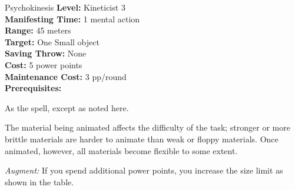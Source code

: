 {Psychokinesis}
{
	\textbf{Level:}
	Kineticist 3\\
	\textbf{Manifesting Time:}
	1 mental action\\
	\textbf{Range:}
	45 meters\\
	\textbf{Target:}
	One Small object\\
	\textbf{Saving Throw:}
	None\\
	\textbf{Cost:}
	5 power points\\
	\textbf{Maintenance Cost:}
	3 pp/round\\
	\textbf{Prerequisites:}
	\\
}
{
	As the  spell, except as noted here.

	The material being animated affects the difficulty of the task; stronger or more brittle materials are harder to animate than weak or floppy materials. Once animated, however, all materials become flexible to some extent.


	\textit{Augment:} If you spend additional power points, you increase the size limit as shown in the table.
}